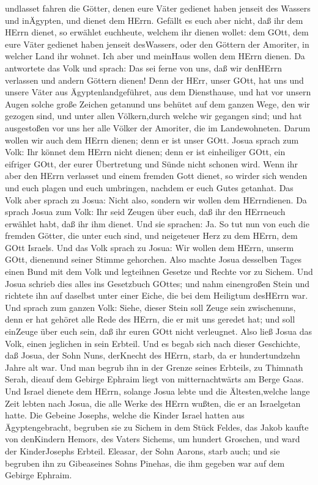 undlasset fahren die Götter, denen eure Väter gedienet haben jenseit des
Wassers und inÄgypten, und dienet dem HErrn.  Gefällt es
euch aber nicht, daß ihr dem HErrn dienet, so erwählet euchheute,
welchem ihr dienen wollet: dem GOtt, dem eure Väter gedienet haben
jenseit desWassers, oder den Göttern der Amoriter, in welcher Land ihr
wohnet. Ich aber und meinHaus wollen dem HErrn dienen.  Da
antwortete das Volk und sprach: Das sei ferne von uns, daß wir denHErrn
verlassen und andern Göttern dienen!  Denn der HErr, unser
GOtt, hat uns und unsere Väter aus Ägyptenlandgeführet, aus dem
Diensthause, und hat vor unsern Augen solche große Zeichen getanund uns
behütet auf dem ganzen Wege, den wir gezogen sind, und unter allen
Völkern,durch welche wir gegangen sind;  und hat
ausgestoßen vor uns her alle Völker der Amoriter, die im Landewohneten.
Darum wollen wir auch dem HErrn dienen; denn er ist unser GOtt.
 Josua sprach zum Volk: Ihr könnet dem HErrn nicht dienen;
denn er ist einheiliger GOtt, ein eifriger GOtt, der eurer Übertretung
und Sünde nicht schonen wird.  Wenn ihr aber den HErrn
verlasset und einem fremden Gott dienet, so wirder sich wenden und euch
plagen und euch umbringen, nachdem er euch Gutes getanhat. 
Das Volk aber sprach zu Josua: Nicht also, sondern wir wollen dem
HErrndienen.  Da sprach Josua zum Volk: Ihr seid Zeugen
über euch, daß ihr den HErrneuch erwählet habt, daß ihr ihm dienet. Und
sie sprachen: Ja.  So tut nun von euch die fremden Götter,
die unter euch sind, und neigeteuer Herz zu dem HErrn, dem GOtt Israels.
 Und das Volk sprach zu Josua: Wir wollen dem HErrn, unserm
GOtt, dienenund seiner Stimme gehorchen.  Also machte Josua
desselben Tages einen Bund mit dem Volk und legteihnen Gesetze und
Rechte vor zu Sichem.  Und Josua schrieb dies alles ins
Gesetzbuch GOttes; und nahm einengroßen Stein und richtete ihn auf
daselbst unter einer Eiche, die bei dem Heiligtum desHErrn war.
 Und sprach zum ganzen Volk: Siehe, dieser Stein soll Zeuge
sein zwischenuns, denn er hat gehöret alle Rede des HErrn, die er mit
uns geredet hat; und soll einZeuge über euch sein, daß ihr euren GOtt
nicht verleugnet.  Also ließ Josua das Volk, einen
jeglichen in sein Erbteil.  Und es begab sich nach dieser
Geschichte, daß Josua, der Sohn Nuns, derKnecht des HErrn, starb, da er
hundertundzehn Jahre alt war.  Und man begrub ihn in der
Grenze seines Erbteils, zu Thimnath Serah, dieauf dem Gebirge Ephraim
liegt von mitternachtwärts am Berge Gaas.  Und Israel
dienete dem HErrn, solange Josua lebte und die Ältesten,welche lange
Zeit lebten nach Josua, die alle Werke des HErrn wußten, die er an
Israelgetan hatte.  Die Gebeine Josephs, welche die Kinder
Israel hatten aus Ägyptengebracht, begruben sie zu Sichem in dem Stück
Feldes, das Jakob kaufte von denKindern Hemors, des Vaters Sichems, um
hundert Groschen, und ward der KinderJosephs Erbteil. 
Eleasar, der Sohn Aarons, starb auch; und sie begruben ihn zu
Gibeaseines Sohns Pinehas, die ihm gegeben war auf dem Gebirge Ephraim.
